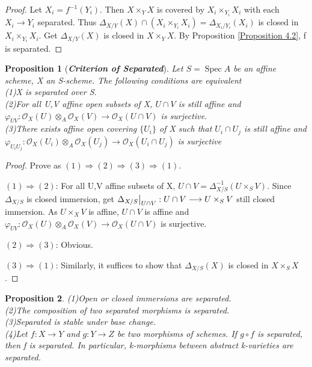 \documentclass{ctexart}
\newtheorem{proposition}{Proposition}[section]
\newcommand{\spec}{\operatorname{Spec}}
\begin{document}
\begin{proof}
    Let $X_{i} = f^{-1}(Y_{i})$.
    Then $X \times_{Y} X$ is covered by $X_{i} \times_{Y_{i}} X_{i}$ with each $X_{i} \longrightarrow Y_{i}$ separated.
    Thus $\Delta_{X/Y}(X) \cap (X_{i} \times_{Y_{i}} X_{i}) = \Delta_{X_{i}/Y_{i}}(X_{i})$ is closed in $X_{i} \times_{Y_{i}} X_{i}$.
    Get $\Delta_{X/Y}(X)$ is closed in $X \times_{Y} X$.
    By Proposition \ref{Proposition 4.2}, f is separated.
\end{proof}
\begin{proposition}[\textbf{\emph{Criterion of Separated}}]
    Let $S = \spec A$ be an affine scheme, X an S-scheme.
    The following conditions are equivalent \\
    (1)X is separated over S. \\
    (2)For all U,V affine open subsets of X, $U \cap V$ is still affine and $\varphi_{UV}: \mathcal{O}_{X}(U) \otimes_{A} \mathcal{O}_{X}(V) \longrightarrow \mathcal{O}_{X}(U \cap V)$ is surjective. \\
    (3)There exists affine open covering $\{U_{i}\}$ of X such that $U_{i} \cap U_{j}$ is still affine and $\varphi_{U_{i}U_{j}}: \mathcal{O}_{X}(U_{i}) \otimes_{A} \mathcal{O}_{X}(U_{j}) \longrightarrow \mathcal{O}_{X}(U_{i} \cap U_{j})$ is surjective
    \label{Proposition 4.4}
\end{proposition}
\begin{proof}
    Prove as $(1) \Rightarrow (2) \Rightarrow (3) \Rightarrow (1)$.
    \par
    $(1) \Rightarrow (2)$: For all U,V affine subsets of X, $U \cap V = \Delta_{X/S}^{-1}(U \times_{S} V)$.
    Since $\Delta_{X/S}$ is closed immersion, get $\Delta_{X/S}\big{|}_{U \cap V}: U \cap V \longrightarrow U \times_{S} V$ still closed immersion.
    As $U \times_{X} V$ is affine, $U \cap V$ is affine and $\varphi_{UV}: \mathcal{O}_{X}(U) \otimes_{A} \mathcal{O}_{X}(V) \longrightarrow \mathcal{O}_{X}(U \cap V)$ is surjective.
    \par
    $(2) \Rightarrow (3)$: Obvious. 
    \par
    $(3) \Rightarrow (1)$: Similarly, it suffices to show that $\Delta_{X/S}(X)$ is closed in $X \times_{S} X$.
\end{proof}
\begin{proposition}
    (1)Open or closed immersions are separated. \\
    (2)The composition of two separated morphisms is separated. \\
    (3)Separated is stable under base change. \\
    (4)Let $f: X \longrightarrow Y$ and $g: Y \longrightarrow Z$ be two morphisms of schemes.
    If $g \circ f$ is separated, then f is separated.
    In particular, k-morphisms between abstract k-varieties are separated.
    \label{Proposition 4.5}
\end{proposition}
\end{document}
